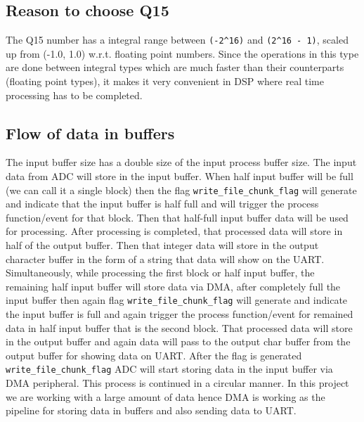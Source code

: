 \documentclass[11pt]{article}
\begin{document}
\subsection{Reason to choose Q15}
\label{sec:org402e760}

The Q15 number has a integral range between \texttt{(-2\textasciicircum{}16)} and \texttt{(2\textasciicircum{}16 - 1)}, scaled up from (-1.0, 1.0) w.r.t. floating point numbers. Since the operations in this type are done between integral types which are much faster than their counterparts (floating point types), it makes it very convenient in DSP where real time processing has to be completed.

\subsection{Flow of data in buffers}
\label{sec:org658853b}

The input buffer size has a double size of the input process buffer size. The input data from ADC will store in the input buffer. When half input buffer will be full (we can call it a single block) then the flag \texttt{write\_file\_chunk\_flag} will generate and indicate that the input buffer is half full and will trigger the process function/event for that block. Then that half-full input buffer data will be used for processing. After processing is completed, that processed data will store in half of the output buffer. Then that integer data will store in the output character buffer in the form of a string that data will show on the UART.  Simultaneously, while processing the first block or half input buffer, the remaining half input buffer will store data via DMA, after completely full the input buffer then again flag \texttt{write\_file\_chunk\_flag} will generate and indicate the input buffer is full and again trigger the process function/event for remained data in half input buffer that is the second block. That processed data will store in the output buffer and again data will pass to the output char buffer from the output buffer for showing data on UART. After the flag is generated \texttt{write\_file\_chunk\_flag} ADC will start storing data in the input buffer via DMA peripheral. This process is continued in a circular manner. In this project we are working with a large amount of data hence DMA is working as the pipeline for storing data in buffers and also sending data to UART.
\end{document}
